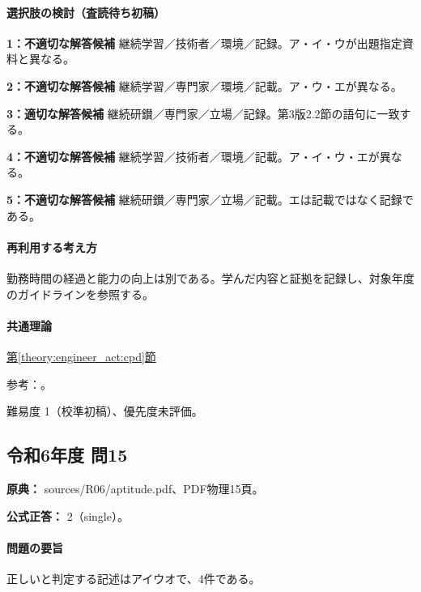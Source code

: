 \paragraph{選択肢の検討（査読待ち初稿）}\mbox{}\par

\noindent\textbf{1：不適切な解答候補} 継続学習／技術者／環境／記録。ア・イ・ウが出題指定資料と異なる。\par

\noindent\textbf{2：不適切な解答候補} 継続学習／専門家／環境／記載。ア・ウ・エが異なる。\par

\noindent\textbf{3：適切な解答候補} 継続研鑚／専門家／立場／記録。第3版2.2節の語句に一致する。\par

\noindent\textbf{4：不適切な解答候補} 継続学習／技術者／環境／記載。ア・イ・ウ・エが異なる。\par

\noindent\textbf{5：不適切な解答候補} 継続研鑚／専門家／立場／記載。エは記載ではなく記録である。\par

\paragraph{再利用する考え方} 勤務時間の経過と能力の向上は別である。学んだ内容と証拠を記録し、対象年度のガイドラインを参照する。

\paragraph{共通理論} \hyperref[theory:engineer_act:cpd]{第\ref*{theory:engineer_act:cpd}節}

\par 参考：\cite{cpd_v3}。

\par 難易度 1（校準初稿）、優先度未評価。

\subsection{令和6年度 問15}
\label{q:r06-reg-apt-15}

\noindent\textbf{原典：} sources/R06/aptitude.pdf、PDF物理15頁。

\textbf{公式正答：} 2（single）。

\paragraph{問題の要旨} 正しいと判定する記述はアイウオで、4件である。

